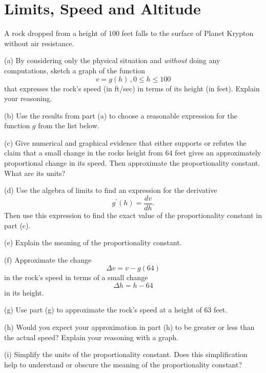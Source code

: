 \documentclass{ximera}
\begin{document}
\section{Limits, Speed and Altitude}
\begin{question}  \label{Ex:defdftd}
A rock dropped from a height of $100$ feet falls to the surface of Planet Krypton without air resistance.

(a) By considering only the physical situation and \emph{without} doing any computations, sketch a graph of the function
\[
    v =g(h) \, , 0\leq h \leq 100
\]
that expresses the rock's speed (in ft/sec) in terms of its height (in feet). Explain your reasoning.

(b) Use the results from part (a) to choose a reasonable expression for the function $g$ from the list below.

\begin{multipleChoice}
\end{multipleChoice}


(c)  Give numerical  and graphical evidence that either supports or refutes the claim that a small change in the rocks height from $64$ feet gives an approximately proportional change in its speed. Then approximate the proportionality constant. What are its units?
  
(d) Use the algebra of limits to find an expression for the derivative
\[
     g^\prime(h) = \frac{dv}{dh} .
\]
Then use this expression to find the exact value of the proportionality constant in part (c).

(e) Explain the meaning of the proportionality constant.

(f) Approximate the change
\[
    \Delta v = v - g(64)
\]
in the rock's speed in terms of a small change
\[
  \Delta h = h - 64
\]
in its height.

(g) Use part (g) to approximate the rock's speed at a height of $63$ feet.

(h) Would you expect your approximation in part (h) to be greater or less than the actual speed? Explain your reasoning with a graph.

(i) Simplify the units of the proportionality constant. Does this simplification help to understand or obscure the meaning of the proportionality constant?
\end{question}
\end{document}
